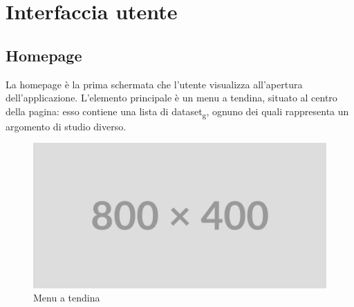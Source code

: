 \section{Interfaccia utente}

\subsection{Homepage}
La homepage è la prima schermata che l'utente visualizza all'apertura
dell'applicazione. L'elemento principale è un menu a tendina, situato al centro
della pagina: esso contiene una lista di dataset\textsubscript{g}, ognuno dei quali rappresenta
un argomento di studio diverso.
\begin{figure}[ht!]
    \centering
    \includegraphics[scale=0.4]{template/images/placeholder.png}
    \caption{Menu a tendina}
\end{figure}

